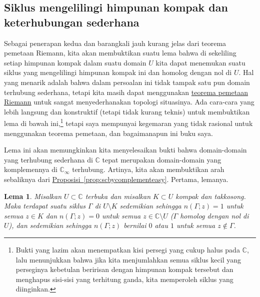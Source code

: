 \documentclass[12pt,openany]{book}
\newcommand{\C}{{\mathbb{C}}}
\theoremstyle{plain}
\newtheorem{lemma}[thm]{Lema}
\theoremstyle{remark}
\theoremstyle{definition}
\theoremstyle{exercise}
\theoremstyle{example}
\newcommand{\propref}[1]{\hyperref[#1]{Proposisi~\ref*{#1}}}
\begin{document}
\subsection{Siklus mengelilingi himpunan kompak dan keterhubungan sederhana}\label{subsec:patharoundK}

Sebagai penerapan kedua dan barangkali jauh kurang jelas dari teorema
pemetaan Riemann,
kita akan membuktikan suatu lema bahwa di sekeliling setiap himpunan kompak dalam suatu domain $U$
kita dapat menemukan suatu siklus yang mengelilingi himpunan kompak ini dan homolog dengan
nol di $U$.
Hal yang menarik adalah bahwa dalam persoalan ini tidak tampak satu pun domain terhubung sederhana,
tetapi kita masih dapat menggunakan
\hyperref[thm:RMT]{teorema pemetaan Riemann}
untuk sangat
menyederhanakan topologi situasinya.
Ada cara-cara yang lebih langsung dan
konstruktif (tetapi tidak kurang teknis) untuk membuktikan lema di bawah ini,\footnote{%
Bukti yang lazim akan menempatkan kisi persegi yang cukup halus pada $\C$, lalu
menunjukkan bahwa jika kita menjumlahkan semua siklus kecil yang perseginya kebetulan beririsan
dengan himpunan kompak tersebut dan menghapus sisi-sisi yang terhitung ganda, kita memperoleh siklus yang diinginkan.}
tetapi saya mempunyai kegemaran yang tidak rasional untuk menggunakan teorema pemetaan, dan bagaimanapun
ini buku saya.

Lema ini akan memungkinkan kita menyelesaikan bukti bahwa domain-domain yang
terhubung sederhana di $\C$ tepat merupakan domain-domain
yang komplemennya di $\C_\infty$ terhubung. Artinya, kita akan membuktikan
arah sebaliknya dari \propref{prop:scbycomplementeasy}. Pertama, lemanya.

\begin{lemma}\label{lemma:patharoundK}
Misalkan $U \subset \C$ terbuka dan misalkan $K \subset U$ kompak dan
takkosong.
Maka terdapat suatu siklus
$\Gamma$ di $U \setminus K$ sedemikian sehingga $n(\Gamma;z) = 1$ untuk semua $z \in K$ dan
$n(\Gamma;z) = 0$ untuk semua $z \in \C \setminus U$ ($\Gamma$ homolog dengan
nol di $U$), dan sedemikian sehingga $n(\Gamma;z)$ bernilai $0$ atau $1$ untuk semua $z \notin
\Gamma$.
\end{lemma}
\end{document}
